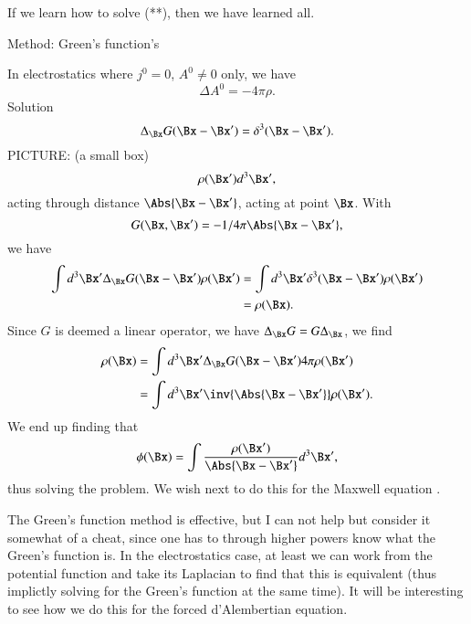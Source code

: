 If we learn how to solve (**), then we have learned all.

Method: Green's function's

In electrostatics where \(j^0 = 0\), \(A^0 \ne 0\) only, we have
%
\begin{equation}\label{eqn:relativisticElectrodynamicsL17b:330}
\Delta A^0 = -4 \pi \rho.
\end{equation}
Solution
%
\begin{equation}\label{eqn:relativisticElectrodynamicsL17b:350}
\Delta_{\Bx} G(\Bx - \Bx') = \delta^3( \Bx - \Bx').
\end{equation}
%
PICTURE: (a small box)
%
\begin{equation}\label{eqn:relativisticElectrodynamicsL17b:370}
\rho(\Bx') d^3 \Bx',
\end{equation}
acting through distance \(\Abs{\Bx - \Bx'}\), acting at point \(\Bx\).  With
\begin{dmath}\label{eqn:relativisticElectrodynamicsL17b:371}
G(\Bx, \Bx') = -1/4 \pi\Abs{\Bx - \Bx'},
\end{dmath}
we have
%
\begin{equation}\label{eqn:relativisticElectrodynamicsL17b:410}
\begin{aligned}
\int d^3 \Bx' \Delta_{\Bx} G(\Bx - \Bx') \rho(\Bx')
&= \int d^3 \Bx' \delta^3( \Bx - \Bx') \rho(\Bx') \\
&= \rho(\Bx).
\end{aligned}
\end{equation}
Since \(G\) is deemed a linear operator, we have \(\Delta_\Bx G = G \Delta_\Bx\), we find
%
\begin{equation}\label{eqn:relativisticElectrodynamicsL17b:430}
\begin{aligned}
\rho(\Bx)
&=
\int d^3 \Bx' \Delta_{\Bx} G(\Bx - \Bx') 4 \pi \rho(\Bx') \\
&=
\int d^3 \Bx' \inv{\Abs{\Bx - \Bx'}} \rho(\Bx').
\end{aligned}
\end{equation}
We end up finding that
%
\begin{equation}\label{eqn:relativisticElectrodynamicsL17b:390}
\phi(\Bx) = \int \frac{\rho(\Bx')}{\Abs{\Bx - \Bx'}} d^3 \Bx',
\end{equation}
thus solving the problem.  We wish next to do this for the Maxwell equation .

The Green's function method is effective, but I can not help but consider it somewhat of a cheat, since one has to through higher powers know what the Green's function is.  In the electrostatics case, at least we can work from the potential function and take its Laplacian to find that this is equivalent (thus implictly solving for the Green's function at the same time).  It will be interesting to see how we do this for the forced d'Alembertian equation.
